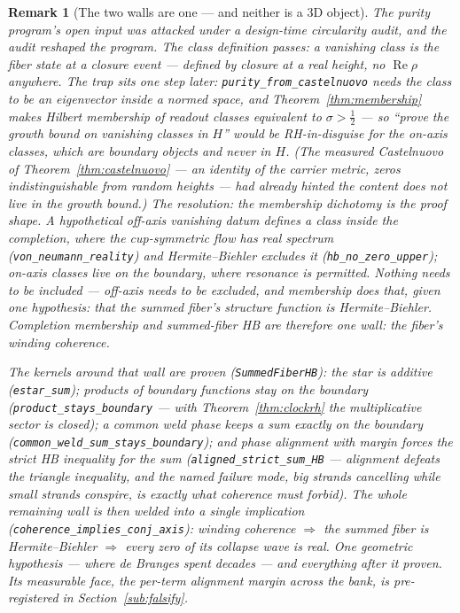 \documentclass[11pt]{article}
\newtheorem{remark}[definition]{Remark}
\DeclareMathOperator{\Ree}{Re}
\newcommand{\code}[1]{\texttt{#1}}
\begin{document}
\begin{remark}[The two walls are one --- and neither is a 3D object]\label{rem:twowalls}
The purity program's open input was attacked under a design-time circularity audit, and the audit
reshaped the program.  The class definition passes: a vanishing class is the fiber state at a
closure event --- defined by closure at a real height, no $\Ree\rho$ anywhere.  The trap sits one
step later: \code{purity\_from\_castelnuovo} needs the class to be an eigenvector \emph{inside} a
normed space, and Theorem~\ref{thm:membership} makes Hilbert membership of readout classes
\emph{equivalent} to $\sigma>\tfrac12$ --- so ``prove the growth bound on vanishing classes in
$H$'' would be RH-in-disguise for the on-axis classes, which are boundary objects and never in
$H$.  (The measured Castelnuovo of Theorem~\ref{thm:castelnuovo} --- an identity of the carrier
metric, zeros indistinguishable from random heights --- had already hinted the content does not
live in the growth bound.)  The resolution: the membership dichotomy \emph{is} the proof shape.
A hypothetical off-axis vanishing datum defines a class \emph{inside} the completion, where the
cup-symmetric flow has real spectrum (\code{von\_neumann\_reality}) and Hermite--Biehler excludes
it (\code{hb\_no\_zero\_upper}); on-axis classes live on the boundary, where resonance is
permitted.  Nothing needs to be included --- off-axis needs to be \emph{excluded}, and
membership does that, given one hypothesis: that the summed fiber's structure function is
Hermite--Biehler.  Completion membership and summed-fiber HB are therefore \emph{one wall}: the
fiber's winding coherence.

The kernels around that wall are proven (\code{SummedFiberHB}): the star is additive
(\code{estar\_sum}); products of boundary functions stay on the boundary
(\code{product\_stays\_boundary} --- with Theorem~\ref{thm:clockrh} the multiplicative sector is
closed); a common weld phase keeps a sum exactly on the boundary
(\code{common\_weld\_sum\_stays\_boundary}); and phase alignment with margin forces the
\emph{strict} HB inequality for the sum (\code{aligned\_strict\_sum\_HB} --- alignment defeats the
triangle inequality, and the named failure mode, big strands cancelling while small strands
conspire, is exactly what coherence must forbid).  The whole remaining wall is then welded into a
single implication (\code{coherence\_implies\_conj\_axis}): \emph{winding coherence $\Rightarrow$ the
summed fiber is Hermite--Biehler $\Rightarrow$ every zero of its collapse wave is real}.  One
geometric hypothesis --- where de Branges spent decades --- and everything after it proven.  Its
measurable face, the per-term alignment margin across the bank, is pre-registered in
Section~\ref{sub:falsify}.


\end{remark}
\end{document}
